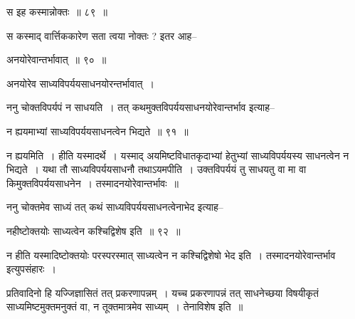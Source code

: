 \documentclass[article,12pt,a4paper]{memoir}
\begin{document}
	  \pstart स इह कस्मान्नोक्तः ॥ ८९ ॥
	\pend
      
	  \endgroup
	 

	  \pstart स कस्माद् वार्त्तिककारेण सता त्वया नोक्तः ? इतर आह--
	\pend
        
	  \bigskip
	  \begingroup
	

	  \pstart अनयोरेवान्तर्भावात् ॥ ९० ॥
	\pend
      
	  \endgroup
	 

	  \pstart अनयोरेव साध्यविपर्ययसाधनयोरन्तर्भावात् ।
	\pend
        

	  \pstart ननु चोक्तविपर्यपं न साधयति । तत् कथमुक्तविपर्ययसाधनयोरेवान्तर्भाव इत्याह--
	\pend
        
	  \bigskip
	  \begingroup
	

	  \pstart न ह्ययमाभ्यां साध्यविपर्ययसाधनत्वेन भिद्यते ॥ ९१ ॥
	\pend
      
	  \endgroup
	 

	  \pstart न ह्ययमिति । हीति यस्मादर्थे । यस्माद् अयमिष्टविधातकृदाभ्यां हेतुभ्यां साध्यविपर्ययस्य साधनत्वेन न भिद्यते । यथा तौ साध्यविपर्ययसाधनौ तथाऽयमपीति । उक्तविपर्ययं तु साधयतु वा मा वा किमुक्तविपर्ययसाधनेन । तस्मादनयोरेवान्तर्भावः ॥
	\pend
        

	  \pstart ननु चोक्तमेव साध्यं तत् कथं साध्यविपर्ययसाधनत्वेनाभेद इत्याह--
	\pend
        
	  \bigskip
	  \begingroup
	

	  \pstart नहीष्टोक्तयोः साध्यत्वेन कश्चिद्विशेष इति ॥ ९२ ॥
	\pend
      
	  \endgroup
	 

	  \pstart न हीति यस्मादिष्टोक्तयोः परस्परस्मात् साध्यत्वेन न कश्चिद्विशेषो भेद इति । तस्मादनयोरेवान्तर्भाव इत्युपसंहारः ।
	\pend
        

	  \pstart प्रतिवादिनो हि यज्जिज्ञासितं तत् प्रकरणापन्नम् । यच्च प्रकरणापन्नं तत् साधनेच्छया विषयीकृतं साध्यमिष्टमुक्तमनुक्तं वा, न तूक्तमात्रमेव साध्यम् । तेनाविशेष इति ॥
	\pend
        
\end{document}
